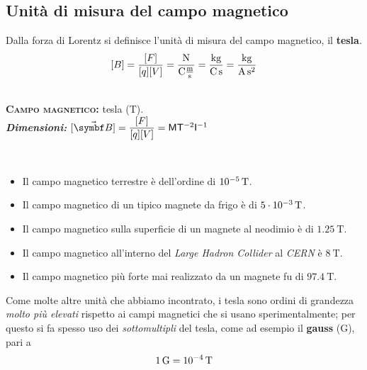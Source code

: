 \subsection{Unità di misura del campo magnetico}
Dalla forza di Lorentz si definisce l'unità di misura del campo magnetico, il \textbf{tesla}.
\begin{equation*}
	\left[B\right]=\frac{[F]}{[q][V]}=\frac{\unit[per-mode = fraction]{\newton}}{\unit{\coulomb}\unit[per-mode = fraction]{ \meter\per\second}}=\unit[per-mode = fraction]{\kilogram\per\coulomb\per\second} = \unit[per-mode = fraction]{\kilogram\per\ampere\per\second\squared}
\end{equation*}
\begin{units}~\\
	\textbf{\textsc{Campo magnetico:}} tesla ($\unit{\tesla}$).\\
	\textit{\textbf{Dimensioni:}} $[\vba{B}]=\dfrac{[F]}{[q][V]}=\mathsf{M} \mathsf{T}^{-2}  \mathsf{I}^{-1}$
\end{units}
	\begin{examples}~
		\begin{itemize}
			\item Il campo magnetico terrestre è dell'ordine di $\SI[exponent-product=\ensuremath{\cdot}]{d-5}{\tesla}$.
			\item Il campo magnetico di un tipico magnete da frigo è di $\SI[exponent-product=\ensuremath{\cdot}]{5d-3}{\tesla}$.
			\item Il campo magnetico sulla superficie di un magnete al neodimio è di $\SI[exponent-product=\ensuremath{\cdot}]{1.25}{\tesla}$. %
			\item Il campo magnetico all'interno del \textit{Large Hadron Collider} al \textit{CERN} è $\SI[exponent-product=\ensuremath{\cdot}]{8}{\tesla}$.
			\item Il campo magnetico più forte mai realizzato da un magnete fu di  $\SI[exponent-product=\ensuremath{\cdot}]{97.4}{\tesla}$.
		\end{itemize}
	\end{examples}
Come molte altre unità che abbiamo incontrato, i tesla sono ordini di grandezza \textit{molto più elevati} rispetto ai campi magnetici che si usano sperimentalmente; per questo si fa spesso uso dei \textit{sottomultipli} del tesla, come ad esempio il \textbf{gauss} ($\text{G}$), pari a
\begin{equation}
	\SI[exponent-product=\ensuremath{\cdot}]{1}{\text{G}}=\SI[exponent-product=\ensuremath{\cdot}]{d-4}{\tesla}
\end{equation}
